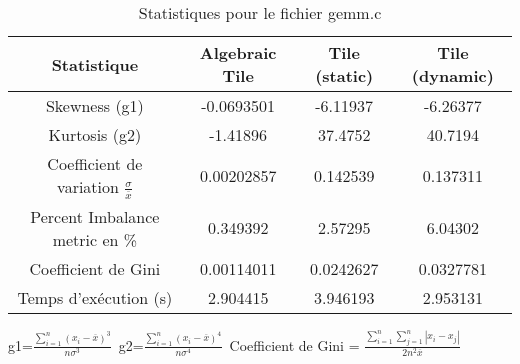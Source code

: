\documentclass{article}
\begin{document}
\begin{table}[htbp]
  \centering
  \caption{Statistiques pour le fichier gemm.c}
  \begin{tabular}{|c|c|c|c|}
    \hline
    Statistique & Algebraic Tile & Tile (static) & Tile (dynamic) \\ 
    \hline
    Skewness (g1)  & -0.0693501 & -6.11937 & -6.26377 \\ 
    Kurtosis (g2)  & -1.41896 & 37.4752 & 40.7194 \\ 
    Coefficient de variation $ \frac{\sigma}{\overline{x}} $ & 0.00202857 & 0.142539 & 0.137311\\ 
    Percent Imbalance metric en \% & 0.349392 & 2.57295 & 6.04302\\ 
    Coefficient de Gini  & 0.00114011 & 0.0242627 & 0.0327781\\ 
    Temps d'exécution (s) &  2.904415    &  3.946193   &  2.953131   \\ 

    \hline
  \end{tabular}
\end{table}
g1=$ \frac{\sum_{i=1}^{n} (x_i - \overline{x})^3}{n\sigma^3} $\
g2=$ \frac{\sum_{i=1}^{n} (x_i - \overline{x})^4}{n\sigma^4} $\
Coefficient de Gini = $ \frac{\sum_{i=1}^{n}\sum_{j=1}^{n} |x_i - x_j|}{2n^2\overline{x}} $\
\newpage
\end{document}
